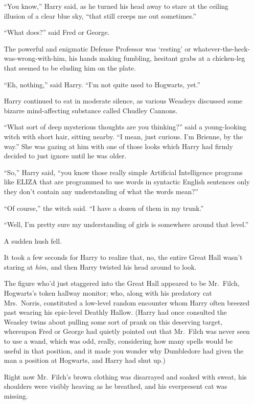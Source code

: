 ``You know,'' Harry said, as he turned his head away to stare at the
ceiling illusion of a clear blue sky, ``that still creeps me out
sometimes.''

``What does?'' said Fred or George.

The powerful and enigmatic Defense Professor was `resting' or
whatever-the-heck-was-wrong-with-him, his hands making fumbling,
hesitant grabs at a chicken-leg that seemed to be eluding him on the
plate.

``Eh, nothing,'' said Harry. ``I'm not quite used to Hogwarts, yet.''

Harry continued to eat in moderate silence, as various Weasleys
discussed some bizarre mind-affecting substance called Chudley Cannons.

``What sort of deep mysterious thoughts are you thinking?'' said a
young-looking witch with short hair, sitting nearby. ``I mean, just
curious. I'm Brienne, by the way.'' She was gazing at him with one of
those looks which Harry had firmly decided to just ignore until he was
older.

``So,'' Harry said, ``you know those really simple Artificial
Intelligence programs like ELIZA that are programmed to use words in
syntactic English sentences only they don't contain any understanding of
what the words mean?''

``Of course,'' the witch said. ``I have a dozen of them in my trunk.''

``Well, I'm pretty sure my understanding of girls is somewhere around
that level.''

A sudden hush fell.

It took a few seconds for Harry to realize that, no, the entire Great
Hall wasn't staring at \emph{him,} and then Harry twisted his head
around to look.

The figure who'd just staggered into the Great Hall appeared to be
Mr.~Filch, Hogwarts's token hallway monitor; who, along with his
predatory cat Mrs.~Norris, constituted a low-level random encounter whom
Harry often breezed past wearing his epic-level Deathly Hallow. (Harry
had once consulted the Weasley twins about pulling some sort of prank on
this deserving target, whereupon Fred or George had quietly pointed out
that Mr.~Filch was never seen to use a wand, which was odd, really,
considering how many spells would be useful in that position, and it
made you wonder why Dumbledore had given the man a position at Hogwarts,
and Harry had shut up.)

Right now Mr.~Filch's brown clothing was disarrayed and soaked with
sweat, his shoulders were visibly heaving as he breathed, and his
everpresent cat was missing.

